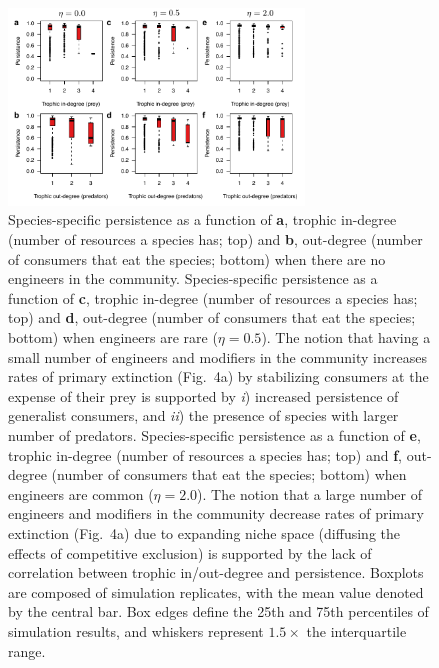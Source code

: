\documentclass[onecolumn,preprintnumbers,amsmath,amssymb,superscriptaddress]{revtex4-1}
\begin{document}
\begin{bibunit}
\begin{figure}[h!]
\centering
\includegraphics[width=0.7\textwidth]{fig_indeng_combined.pdf}
\caption{
Species-specific persistence as a function of \textbf{a}, trophic in-degree (number of resources a species has; top) and \textbf{b}, out-degree (number of consumers that eat the species; bottom) when there are no engineers in the community. 
Species-specific persistence as a function of \textbf{c}, trophic in-degree (number of resources a species has; top) and \textbf{d}, out-degree (number of consumers that eat the species; bottom) when engineers are rare ($\eta = 0.5$).
The notion that having a small number of engineers and modifiers in the community increases rates of primary extinction (Fig.\ 4a) by stabilizing consumers at the expense of their prey is supported by \emph{i}) increased persistence of generalist consumers, and \emph{ii}) the presence of species with larger number of predators.
Species-specific persistence as a function of \textbf{e}, trophic in-degree (number of resources a species has; top) and \textbf{f}, out-degree (number of consumers that eat the species; bottom) when engineers are common ($\eta = 2.0$).
The notion that a large number of engineers and modifiers in the community decrease rates of primary extinction (Fig.\ 4a) due to expanding niche space (diffusing the effects of competitive exclusion) is supported by the lack of correlation between trophic in/out-degree and persistence.
Boxplots are composed of simulation replicates, with the mean value denoted by the central bar.
Box edges define the 25th and 75th percentiles of simulation results, and whiskers represent $1.5\times$ the interquartile range.}
\label{fig:indeng}
\end{figure}





\end{bibunit}
\end{document}
